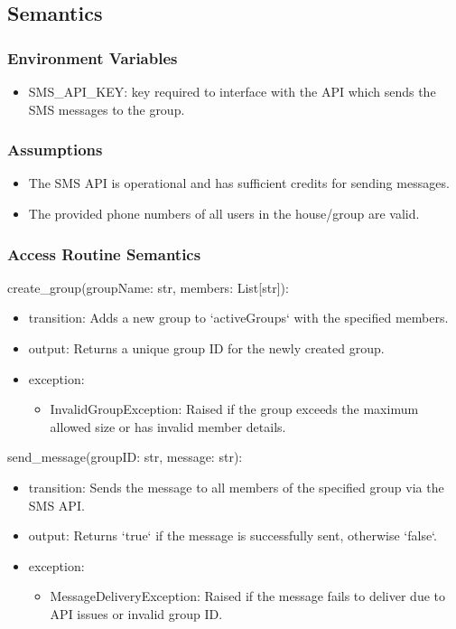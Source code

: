 \documentclass[12pt, titlepage]{article}
\begin{document}
\subsection{Semantics}

\subsubsection{Environment Variables}

\begin{itemize}
\item SMS\_API\_KEY: key required to interface with the API which sends the SMS messages to the group.
\end{itemize}

\subsubsection{Assumptions}

\begin{itemize}
  \item The SMS API is operational and has sufficient credits for sending messages.
  \item The provided phone numbers of all users in the house/group are valid.
\end{itemize}

\subsubsection{Access Routine Semantics}

\noindent create{\_}group(groupName: str, members: List[str]):
\begin{itemize}
\item transition: Adds a new group to `activeGroups` with the specified members.
\item output: Returns a unique group ID for the newly created group.
\item exception: 
\begin{itemize}
  \item InvalidGroupException: Raised if the group exceeds the maximum allowed size or has invalid member details.
\end{itemize}
\end{itemize}

\noindent send{\_}message(groupID: str, message: str):
\begin{itemize}
\item transition: Sends the message to all members of the specified group via the SMS API.
\item output: Returns `true` if the message is successfully sent, otherwise `false`.
\item exception: 
\begin{itemize}
  \item MessageDeliveryException: Raised if the message fails to deliver due to API issues or invalid group ID.
\end{itemize}
\end{itemize}
\end{document}
